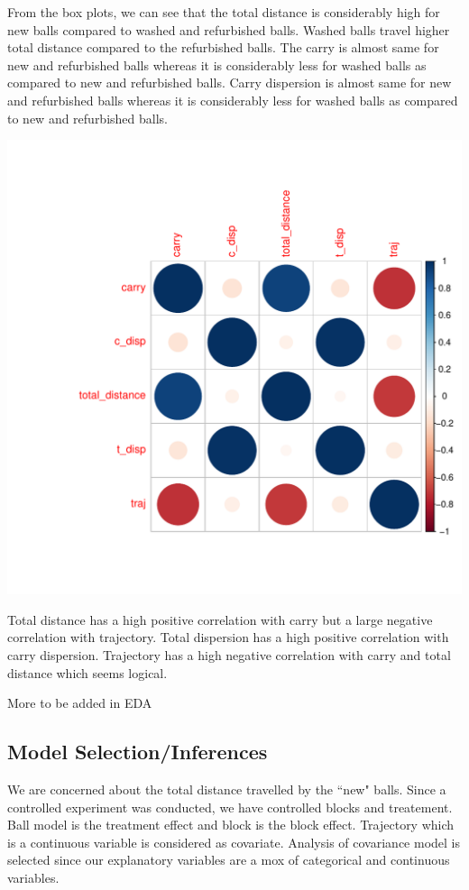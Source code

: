 \documentclass{article}\usepackage[]{graphicx}\usepackage[]{color}
\makeatletter
\def\maxwidth{ %
  \ifdim\Gin@nat@width>\linewidth
    \linewidth
  \else
    \Gin@nat@width
  \fi
}
\makeatother
\begin{document}
From the box plots, we can see that the total distance is considerably high for new balls compared to washed and refurbished balls. Washed balls travel higher total distance compared to the refurbished balls. The carry is almost same for new and refurbished balls whereas it is considerably less for washed balls as compared to new and refurbished balls. Carry dispersion is almost same for new and refurbished balls whereas it is considerably less for washed balls as compared to new and refurbished balls.


\includegraphics[width=\maxwidth]{figure/Correlation_plot-1} 

Total distance has a high positive correlation with carry but a large negative correlation with trajectory. Total dispersion has a high positive correlation with carry dispersion. Trajectory has a high negative correlation with carry and total distance which seems logical.


More to be added in EDA

\subsection*{Model Selection/Inferences}
We are concerned about the total distance travelled by the ``new" balls. Since a controlled experiment was conducted, we have controlled blocks and treatement. Ball model is the treatment effect and block is the block effect. Trajectory which is a continuous variable is considered as covariate. Analysis of covariance model is selected since our explanatory variables are a mox of categorical and continuous variables.
\end{document}
